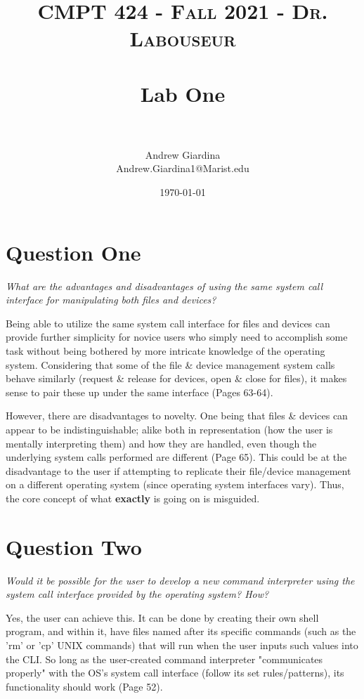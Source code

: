 \documentclass[letterpaper, 10pt,DIV=13]{scrartcl}
\title{	
   \normalfont \normalsize 
   \textsc{CMPT 424 - Fall 2021 - Dr. Labouseur} \\[10pt] %
   \horrule{0.5pt} \\[0.25cm] 	%
   \huge Lab One  \\     	    %
   \horrule{0.5pt} \\[0.25cm] 	%
}
\author{Andrew Giardina \\ \normalsize Andrew.Giardina1@Marist.edu}
\date{\normalsize\today} 	%
\numberwithin{equation}{section} %
\numberwithin{figure}{section} %
\numberwithin{table}{section} %
\begin{document}
\maketitle %

\section{Question One}

\textit{What are	the	advantages	and	disadvantages	of	using	the	same	system	call	interface for	manipulating	both	files	and	devices?}

Being able to utilize the same system call interface for files and devices can provide further simplicity for novice users who simply need to accomplish some task without being bothered by more intricate knowledge of the operating system. Considering that some of the file \& device management system calls behave similarly (request \& release for devices, open \& close for files), it makes sense to pair these up under the same interface (Pages 63-64).

However, there are disadvantages to novelty. One being that files \& devices can appear to be indistinguishable; alike both in representation (how the user is mentally interpreting them) and how they are handled, even though the underlying system calls performed are different (Page 65). This could be at the disadvantage to the user if attempting to replicate their file/device management on a different operating system (since operating system interfaces vary). Thus, the core concept of what \textbf{exactly} is going on is misguided.

\section{Question Two}

\textit{Would	it	be	possible	for	the	user	to	develop	a	new	command	interpreter	using	the	
system	call	interface	provided	by	the	operating	system?	How?
}

Yes, the user can achieve this.  It can be done by creating their own shell program, and within it, have files named after its specific commands (such as the 'rm' or 'cp' UNIX commands) that will run when the user inputs such values into the CLI. So long as the user-created command interpreter "communicates properly" with the OS's system call interface (follow its set rules/patterns), its functionality should work (Page 52).
\end{document}
